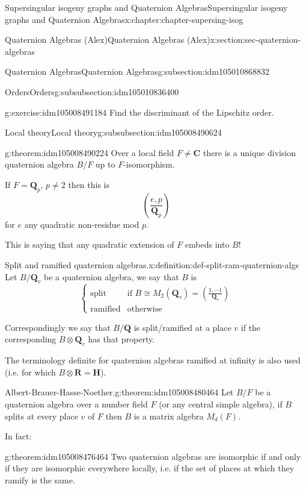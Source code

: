 \documentclass[oneside,10pt,]{book}
\numberwithin{equation}{section}
\newcommand{\legendre}[2]{\left(\frac{#1}{#2}\right)}
\newcommand{\QQ}{\mathbf{Q}}
\newcommand{\RR}{\mathbf{R}}
\newcommand{\CC}{\mathbf{C}}
\newcommand{\HH}{\mathbf{H}}
\newcommand{\amp}{&}
\begin{document}
\begin{chapterptx}{Supersingular isogeny graphs and Quaternion Algebras}{}{Supersingular isogeny graphs and Quaternion Algebras}{}{}{x:chapter:chapter-supersing-isog}
\begin{sectionptx}{Quaternion Algebras (Alex)}{}{Quaternion Algebras (Alex)}{}{}{x:section:sec-quaternion-algebras}
\begin{subsectionptx}{Quaternion Algebras}{}{Quaternion Algebras}{}{}{g:subsection:idm105010868832}
\begin{subsubsectionptx}{Orders}{}{Orders}{}{}{g:subsubsection:idm105010836400}
\begin{inlineexercise}{}{g:exercise:idm105008491184}
Find the discriminant of the Lipschitz order.%
\end{inlineexercise}
\end{subsubsectionptx}
%
%
\typeout{************************************************}
\typeout{************************************************}
%
\begin{subsubsectionptx}{Local theory}{}{Local theory}{}{}{g:subsubsection:idm105008490624}
\begin{theorem}{}{}{g:theorem:idm105008490224}%
Over a local field \(F \ne \CC\) there is a unique division quaternion algebra \(B/F\) up to \(F\)-isomorphism.%
\par
If \(F = \QQ_p\), \(p\ne 2\) then this is%
\begin{equation*}
\legendre{e,p}{\QQ_p}
\end{equation*}
for \(e\) any quadratic non-residue mod \(p\).%
\par
This is saying that any quadratic extension of \(F\) embeds into \(B\)!%
\end{theorem}
\begin{definition}{Split and ramified quaternion algebras.}{x:definition:def-split-ram-quaternion-algs}%
Let \(B/\QQ_v\) be a quaternion algebra, we say that \(B\) is%
\begin{equation*}
\begin{cases}
\text{split} \amp \text{if } B\cong M_2(\QQ_v)  = \legendre{1,-1}{\QQ_v}\\
\text{ramified} \amp \text{otherwise}
\end{cases}
\end{equation*}
%
\par
Correspondingly we say that \(B/\QQ\) is split\slash{}ramified at a place \(v\) if the corresponding \(B\otimes \QQ_v\) has that property.%
\end{definition}
The terminology definite for quaternion algebras ramified at infinity is also used (i.e. for which \(B\otimes \RR = \HH\)).%
\begin{theorem}{Albert-Brauer-Hasse-Noether.}{}{g:theorem:idm105008480464}%
Let \(B/F\) be a quaternion algebra  over  a  number field \(F\) (or any central simple algebra), if \(B\) splits at every place \(v\) of \(F\) then \(B\) is a matrix algebra \(M_d (F)\).%
\end{theorem}
In fact:%
\begin{theorem}{}{}{g:theorem:idm105008476464}%
Two quaternion algebras are isomorphic if and only if they are isomorphic everywhere locally, i.e. if the set of places at which they ramify is the same.%

\end{theorem}
\end{subsubsectionptx}
\end{subsectionptx}
\end{sectionptx}
\end{chapterptx}
\end{document}
